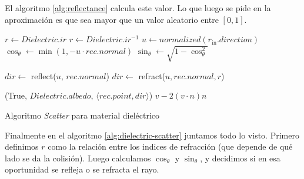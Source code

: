 El algoritmo \ref{alg:reflectance} calcula este valor. Lo que luego se pide en
la aproximación es que sea mayor que un valor aleatorio entre $[0, 1]$.

\begin{algorithm}
\begin{algorithmic}[1]
    \State $r \gets Dielectric.ir$
        \State $r \gets Dielectric.ir^{-1}$
    \EndIf
    \State $u \gets normalized(r_{\text{in}}.direction)$
    \State $\cos_{\theta} \gets \min(1, -u \cdot rec.normal)$
    \State $\sin_{\theta} \gets \sqrt{1 - \cos_{\theta}^2}$

        \State $dir \gets$ reflect($u$, $rec.normal$)
    \Else
        \State $dir \gets$ refract($u, rec.normal, r$)
    \EndIf

    \State \Return (True, $Dielectric.albedo$, $\langle rec.point, dir \rangle$)
\EndFunction
{}
    \State \Return $v - 2 (v \cdot n) n$
\EndFunction
\end{algorithmic}
\caption{Algoritmo \textit{Scatter} para material dieléctrico}
\label{alg:dielectric-scatter}
\end{algorithm}

Finalmente en el algoritmo \ref{alg:dielectric-scatter} juntamos todo lo visto.
Primero definimos $r$ como la relación entre los indices de refracción (que
depende de qué lado se da la colisión). Luego calculamos $\cos_{\theta}$ y
$\sin_{\theta}$, y decidimos si en esa oportunidad se refleja o se refracta el
rayo.
